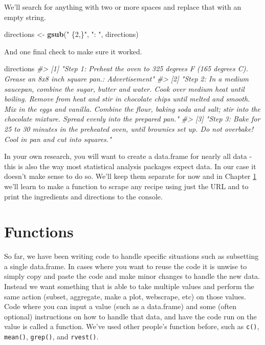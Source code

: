 \documentclass[
  12pt,
]{book}
\newenvironment{Shaded}{\begin{snugshade}}{\end{snugshade}}
\newcommand{\CommentTok}[1]{\textcolor[rgb]{0.37,0.37,0.37}{\textit{#1}}}
\newcommand{\KeywordTok}[1]{\textcolor[rgb]{0.27,0.27,0.27}{\textbf{#1}}}
\newcommand{\NormalTok}[1]{#1}
\newcommand{\StringTok}[1]{\textcolor[rgb]{0.5,0.5,0.5}{#1}}
\begin{document}
We'll search for anything with two or more spaces and replace that with an empty string.

\begin{Shaded}
\begin{Highlighting}[]
\NormalTok{directions \textless{}{-}}\StringTok{ }\KeywordTok{gsub}\NormalTok{(}\StringTok{" \{2,\}"}\NormalTok{, }\StringTok{": "}\NormalTok{, directions)}
\end{Highlighting}
\end{Shaded}

And one final check to make sure it worked.

\begin{Shaded}
\begin{Highlighting}[]
\NormalTok{directions}
\CommentTok{\#\textgreater{} [1] "Step 1: Preheat the oven to 325 degrees F (165 degrees C). Grease an 8x8 inch square pan.: Advertisement"                                                                                                                                                                                                                 }
\CommentTok{\#\textgreater{} [2] "Step 2: In a medium saucepan, combine the sugar, butter and water. Cook over medium heat until boiling. Remove from heat and stir in chocolate chips until melted and smooth. Mix in the eggs and vanilla. Combine the flour, baking soda and salt; stir into the chocolate mixture. Spread evenly into the prepared pan."}
\CommentTok{\#\textgreater{} [3] "Step 3: Bake for 25 to 30 minutes in the preheated oven, until brownies set up. Do not overbake! Cool in pan and cut into squares."}
\end{Highlighting}
\end{Shaded}

In your own research, you will want to create a data.frame for nearly all data - this is also the way most statistical analysis packages expect data. In our case it doesn't make sense to do so. We'll keep them separate for now and in Chapter \ref{functions} we'll learn to make a function to scrape any recipe using just the URL and to print the ingredients and directions to the console.

\hypertarget{functions}{%
\chapter{Functions}\label{functions}}

So far, we have been writing code to handle specific situations such as subsetting a single data.frame. In cases where you want to reuse the code it is unwise to simply copy and paste the code and make minor changes to handle the new data. Instead we want something that is able to take multiple values and perform the same action (subset, aggregate, make a plot, webscrape, etc) on those values. Code where you can input a value (such as a data.frame) and some (often optional) instructions on how to handle that data, and have the code run on the value is called a function. We've used other people's function before, such as \texttt{c()}, \texttt{mean()}, \texttt{grep()}, and \texttt{rvest()}.
\end{document}
